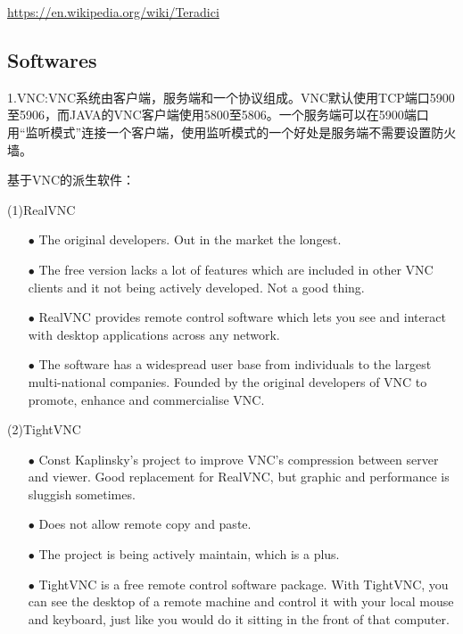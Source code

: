 \documentclass[a4paper,twoside]{scrbook}
\begin{document}
\begin{CJK}{UTF8}{gbsn}
\url{https://en.wikipedia.org/wiki/Teradici}

\subsection{Softwares}
1.VNC:VNC系统由客户端，服务端和一个协议组成。VNC默认使用TCP端口5900至5906，而JAVA的VNC客户端使用5800至5806。一个服务端可以在5900端口用“监听模式”连接一个客户端，使用监听模式的一个好处是服务端不需要设置防火墙。

基于VNC的派生软件：

(1)RealVNC
\begin{itemize}
\item[$\bullet$]The original developers. Out in the market the longest.
\item[$\bullet$]The free version lacks a lot of features which are included in other VNC clients and it not being actively developed. Not a good thing.
\item[$\bullet$]RealVNC provides remote control software which lets you see and interact with desktop applications across any network.
\item[$\bullet$]The software has a widespread user base from individuals to the largest multi-national companies. Founded by the original developers of VNC to promote, enhance and commercialise VNC.
\end{itemize}

(2)TightVNC
\begin{itemize}
\item[$\bullet$]Const Kaplinsky’s project to improve VNC’s compression between server and viewer. Good replacement for RealVNC, but graphic and performance is sluggish sometimes.
\item[$\bullet$]Does not allow remote copy and paste.
\item[$\bullet$]The project is being actively maintain, which is a plus.
\item[$\bullet$]TightVNC is a free remote control software package. With TightVNC, you can see the desktop of a remote machine and control it with your local mouse and keyboard, just like you would do it sitting in the front of that computer.
\end{itemize}


\end{CJK}
\end{document}
